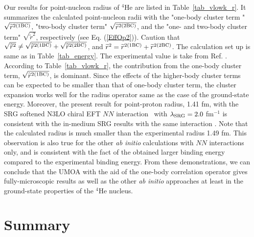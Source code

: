 \documentclass[aps,prc, dvips, twocolumn,groupedaddress,showkeys,showpacs,floatfix,superscriptaddress]{revtex4-1}
\newcommand{\<}{\langle}
\renewcommand{\>}{\rangle}
\begin{document}
Our results for point-nucleon radius of $^{4}$He are listed in Table~\ref{tab_vlowk_r}.
It summarizes the calculated point-nucleon radii with the "one-body cluster
term " $\sqrt{\widetilde{r}^{2({\rm 1BC})}}$, "two-body cluster term" $\sqrt{\widetilde{r}^{2({\rm 2BC})}}$,
and the "one- and two-body cluster term" $\sqrt{\widetilde{r}^{2}}$, respectively (see Eq. (\ref{EffOp2})).
Caution that $\sqrt{\widetilde{r}^{2}} \neq \sqrt{\widetilde{r}^{2({\rm 1BC})}} + \sqrt{\widetilde{r}^{2({\rm 2BC})}}$,
and $\widetilde{r}^{2} = \widetilde{r}^{2({\rm 1BC})} + \widetilde{r}^{2({\rm 2BC})}$.
The calculation set up is same as in Table~\ref{tab_energy}.
The experimental value is take from Ref. \cite{Alkhazov:1997}.
 According to Table~\ref{tab_vlowk_r}, the contribution from the one-body cluster
 term, $\sqrt{\widetilde{r}^{2({\rm 1BC})}}$, is dominant.
Since the effects of the higher-body cluster terms can be expected to be smaller
 than that of one-body cluster term,
 the cluster expansion works well for the radius operator same as the case of the ground-state energy.
Moreover, the present result for point-proton radius, 1.41 fm, with the SRG softened N$3$LO chiral EFT $NN$ interaction~\cite{Entem:2003}
 with $\lambda_{\rm SRG}= 2.0$ fm$^{-1}$ is consistent with the in-medium SRG results with the same interaction \cite{Hergert:2016}.
Note that the calculated radius is much smaller than the experimental radius 1.49 fm.
 This observation is also true for the other {\it ab initio} calculations with $NN$ interactions only,
and is consistent with the fact of the obtained larger binding energy compared to the experimental binding energy.
From these demonstrations, we can conclude that the UMOA with the aid of the one-body correlation operator
gives fully-microscopic results as well as the other {\em ab initio} approaches at least in the ground-state properties of the $^4$He nucleus.








\section{\label{sec:sum}Summary}
\end{document}

